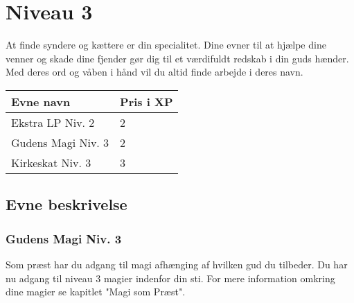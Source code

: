 \chapter*{Niveau 3}
At finde syndere og kættere er din specialitet. Dine evner til at hjælpe dine venner og skade dine fjender gør dig til et værdifuldt redskab i din guds hænder. Med deres ord og våben i hånd vil du altid finde arbejde i deres navn.

\begin{table}[H]
    \centering
    \begin{tabular}{|p{}|p{}|}
    \rowcolor{cerulean!80}\hline
        Evne navn & Pris i XP \\\hline
            Ekstra LP Niv. 2 & 2\\\hline
            Gudens Magi Niv. 3 & 2\\\hline
            Kirkeskat Niv. 3 & 3\\\hline
    \end{tabular}
\end{table}

\section*{Evne beskrivelse}



\subsection*{Gudens Magi Niv. 3}
Som præst har du adgang til magi afhænging af hvilken gud du tilbeder. Du har nu adgang til niveau 3 magier indenfor din sti. For mere information omkring dine magier se kapitlet "Magi som Præst".

